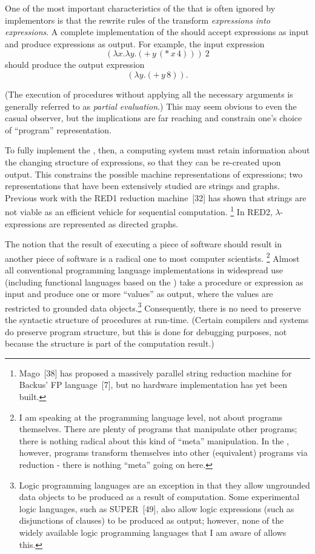 One of the most important characteristics of the \lambdacalculus{} that is often
ignored by implementors is that the rewrite rules of the \lambdacalculus{}
transform \emph{expressions into expressions}. A complete implementation of the
\lambdacalculus{} should accept expressions as input and produce expressions as
output. For example, the input expression
\[
(\lambda x.\lambda y.(+\,y\,(*\,x\,4)))\ 2
\]
should produce the output expression
\[
(\lambda y.(+\,y\,8)).
\]

(The execution of procedures without applying all the necessary arguments is
generally referred to as \emph{partial evaluation}.) This may seem obvious to even the
casual observer, but the implications are far reaching and constrain one's
choice of ``program'' representation.

To fully implement the \lambdacalculus, then, a computing system must retain
information about the changing structure of expressions, so that they can be
re-created upon output. This constrains the possible machine representations of
expressions; two representations that have been extensively studied are strings
and graphs. Previous work with the RED1 reduction machine~[32] has shown that
strings are not viable as an efficient vehicle for sequential computation.
\footnote{Mago~[38] has proposed a massively parallel string reduction machine
for Backus' FP language~[7], but no hardware implementation has yet been built.}
In RED2, \(\lambda\)-expressions are represented as directed graphs.

The notion that the result of executing a piece of software should result in
another piece of software is a radical one to most computer scientists.
\footnote{I am speaking at the programming language level, not about programs
themselves. There are plenty of programs that manipulate other programs; there
is nothing radical about this kind of ``meta'' manipulation. In the
\lambdacalculus, however, programs transform themselves into other (equivalent)
programs via reduction - there is nothing ``meta'' going on here.} Almost all
conventional programming language implementations in widespread use (including
functional languages based on the \lambdacalculus) take a procedure or
expression as input and produce one or more ``values'' as output, where the
values are restricted to grounded data objects.\footnote{Logic programming
languages are an exception in that they allow ungrounded data objects to be
produced as a result of computation. Some experimental logic languages, such as
SUPER~[49], also allow logic expressions (such as disjunctions of clauses) to be
produced as output; however, none of the widely available logic programming
languages that I am aware of allows this.} Consequently, there is no need to
preserve the syntactic structure of procedures at run-time. (Certain compilers
and systems do preserve program structure, but this is done for debugging
purposes, not because the structure is part of the computation result.)


